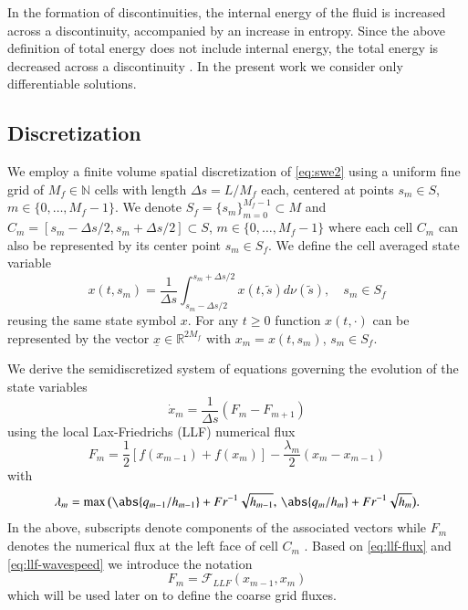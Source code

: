 \documentclass[letterpaper,10pt,3p,preprint]{elsarticle}
\newcommand{\Nbb}{\mathbb{N}}
\newcommand{\Rbb}{\mathbb{R}}
\newcommand{\Fcal}{\mathcal{F}}
\newcommand{\vect}[1]{\underline{#1}}
\begin{document}
In the formation of discontinuities, the internal energy of
the fluid is increased across a discontinuity, accompanied by an
increase in entropy.
Since the above definition of total energy does not
include internal energy, the total energy is decreased across a
discontinuity \cite{Whitham1999}.
In the present work we consider only differentiable solutions.

\subsection{Discretization}\label{sec:swe-discretization}
We employ a finite volume spatial discretization of
\eqref{eq:swe2}
using a uniform fine grid of $M_f\in\Nbb$ cells with length
$\Delta s=L/M_f$ each, centered at points
$s_m\in S$, $m\in\{0,\ldots,M_f-1\}$.
We denote
$S_f=\{s_m\}_{m=0}^{M_f-1}\subset M$
and
$C_m=[s_m-\Delta s/2,s_m+\Delta s/2]\subset S$,
$m\in\{0,\ldots,M_f-1\}$
where each cell $C_m$ can also be represented by its
center point $s_m\in S_f$.
We define the cell averaged state variable
\begin{equation*}
    x(t,s_m)=\frac{1}{\Delta s}\int_{s_m-\Delta s/2}^{s_m+\Delta s/2}
        x(t,\tilde{s})d\nu(\tilde{s}),\quad s_m\in S_f
\end{equation*}
reusing the same state symbol $x$.
For any $t\geq 0$ function $x(t,\cdot)$ can be represented by
the vector $\vect{x}\in\Rbb^{2M_f}$
with $x_m=x(t,s_m)$, $s_m\in S_f$.

We derive the semidiscretized system of equations governing the
evolution of the state variables
\begin{equation}\label{eq:swe-semi}
    \dot{x}_m=\frac{1}{\Delta s}(F_m-F_{m+1})
\end{equation}
using the local Lax-Friedrichs (LLF) numerical flux
\begin{equation}\label{eq:llf-flux}
    F_m=\frac{1}{2}[f(x_{m-1})+f(x_m)]
        -\frac{\lambda_m}{2}(x_m-x_{m-1})
\end{equation}
with
\begin{equation}\label{eq:llf-wavespeed}
    \lambda_m=\max\,\bigl(\abs{q_{m-1}/h_{m-1}}+Fr^{-1}\sqrt{h_{m-1}},
        \,\abs{q_m/h_m}+Fr^{-1}\sqrt{h_m}\bigr).
\end{equation}
In the above, subscripts denote components of the associated vectors
while $F_m$ denotes the numerical flux at the left face
of cell $C_m$ \cite{LeVeque2002}.
Based on \eqref{eq:llf-flux} and \eqref{eq:llf-wavespeed}
we introduce the notation
\begin{equation*}
    F_m=\Fcal_{LLF}(x_{m-1},x_m)
\end{equation*}
which will be used later on to define the coarse grid fluxes.
\end{document}
